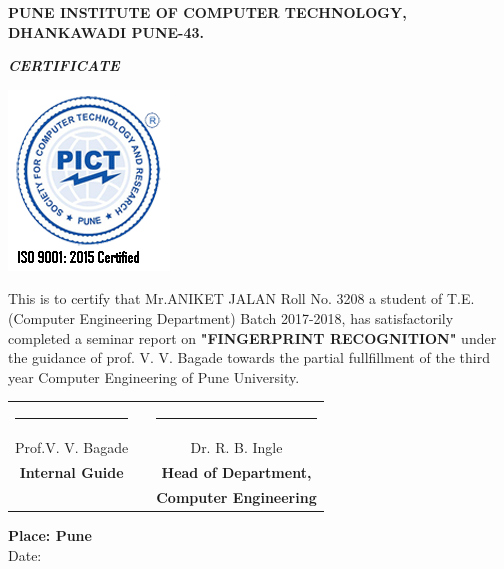\documentclass[a4paper, 12pt]{article}
\begin{document}
\pagebreak
\begin{center}
	\textbf{PUNE INSTITUTE OF COMPUTER TECHNOLOGY,}	\\
	\textbf{DHANKAWADI PUNE-43.}
	\vspace{1cm}
	
	\large
	\textbf{\textit{CERTIFICATE}}
	\vspace{1cm}
	
	\includegraphics[scale=0.6]{pict.png} 
	\linebreak
\end{center}	
	
	    
		 This is to certify that Mr.ANIKET JALAN Roll No. 3208
		 a student of T.E. (Computer Engineering Department) Batch 2017-2018, has
		 satisfactorily completed a seminar report on 
		 \textbf{"FINGERPRINT RECOGNITION"} under the guidance of prof. V. V. Bagade towards the partial fullfillment of the third year Computer Engineering  of Pune University.  
		 \vspace{2cm}
		 
		\begin{center}
		\begin{table}[h]
		\begin{tabular}{ccc}
		\vspace{0.5cm}
		
		\noindent\rule{4cm}{0.4pt}    &                  & \hspace{47mm} \noindent\rule{4cm}{0.4pt}\\
		Prof.V. V. Bagade    &                        &  \hspace{52mm} Dr. R. B. Ingle\\
		\textbf{Internal Guide}      &                     &    \hspace{52mm} \textbf{Head of Department,} \\
		          &                         &       \hspace{50mm}\textbf{Computer Engineering} \\
		\end{tabular}
		\end{table}
		\end{center}
\textbf{Place: Pune}\\
Date:
 \newpage
\tableofcontents
\newpage
\end{document}
